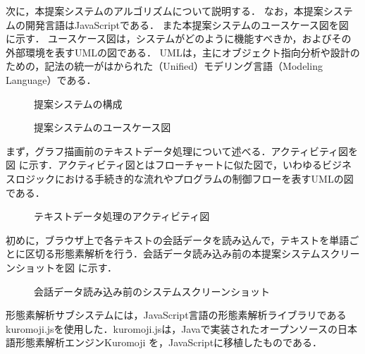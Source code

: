 \documentclass[shuuron]{kuee}
\begin{document}
次に，本提案システムのアルゴリズムについて説明する．
なお，本提案システムの開発言語はJavaScriptである．
また本提案システムのユースケース図を図
に示す．
ユースケース図は，システムがどのように機能すべきか，およびその外部環境を表すUMLの図である．
UMLは，主にオブジェクト指向分析や設計のための，記法の統一がはかられた（Unified）モデリング言語（Modeling Language）である．


\begin{figure}
   \begin{center}
   \end{center}
   \caption{提案システムの構成}
   \label{fig:4_2}
 \end{figure}

\begin{figure}
   \begin{center}
   \end{center}
   \caption{提案システムのユースケース図}
   \label{fig:use_case_diagram}
 \end{figure}


まず，グラフ描画前のテキストデータ処理について述べる．アクティビティ図を図
に示す．アクティビティ図とはフローチャートに似た図で，いわゆるビジネスロジックにおける手続き的な流れやプログラムの制御フローを表すUMLの図である．
\begin{figure}
   \begin{center}
   \end{center}
   \caption{テキストデータ処理のアクティビティ図}
   \label{fig:activity}
\end{figure}


初めに，ブラウザ上で各テキストの会話データを読み込んで，テキストを単語ごとに区切る形態素解析を行う．会話データ読み込み前の本提案システムスクリーンショットを図
に示す．
 \begin{figure}
   \begin{center}
   \end{center}
   \caption{会話データ読み込み前のシステムスクリーンショット}
   \label{fig:yomikomimae2}
 \end{figure}
形態素解析サブシステムには，JavaScript言語の形態素解析ライブラリであるkuromoji.js\cite{kuromojijs}を使用した．kuromoji.jsは，Javaで実装されたオープンソースの日本語形態素解析エンジンKuromoji
を，JavaScriptに移植したものである．
\end{document}
